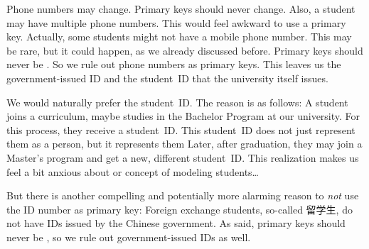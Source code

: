 Phone numbers may change.
Primary keys should never change.
Also, a student may have multiple phone numbers.
This would feel awkward to use a primary key.
Actually, some students might not have a mobile phone number.
This may be rare, but it could happen, as we already discussed before.
Primary keys should never be .
So we rule out phone numbers as primary keys.
This leaves us the government-issued ID and the student~ID that the university itself issues.

We would naturally prefer the student~ID.
The reason is as follows:
A student joins a curriculum, maybe studies in the Bachelor Program  at our university.
For this process, they receive a student~ID.
This student~ID does not just represent them as a person, but it represents them 
Later, after graduation, they may join a Master's program and get a new, different student~ID.
This realization makes us feel a bit anxious about or concept of modeling students\dots

But there is another compelling and potentially more alarming reason to \emph{not} use the ID number as primary key:
Foreign exchange students, so-called 留学生, do not have IDs issued by the Chinese government.
As said, primary keys should never be , so we rule out government-issued IDs as well.

